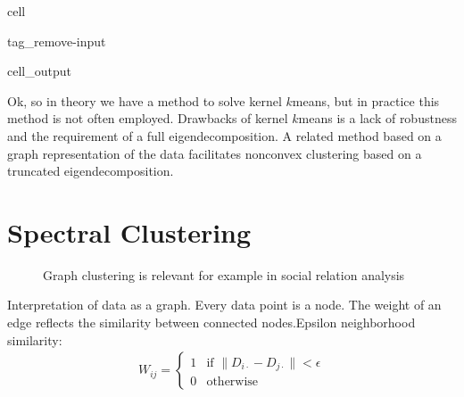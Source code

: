 \documentclass[letterpaper,10pt,english]{jupyterBook}
\let\sphinxpxdimen\pdfpxdimen\else\newdimen\sphinxpxdimen
\begin{document}
\begin{sphinxuseclass}{cell}
\begin{sphinxuseclass}{tag_remove-input}\begin{sphinxVerbatimOutput}

\begin{sphinxuseclass}{cell_output}
\noindent{}

\end{sphinxuseclass}\end{sphinxVerbatimOutput}

\end{sphinxuseclass}
\end{sphinxuseclass}
\sphinxAtStartPar
Ok, so in theory we have a method to solve kernel \(k\)\sphinxhyphen{}means, but in practice this method is not often employed. Drawbacks of kernel \(k\)\sphinxhyphen{}means is a lack of robustness and the requirement of a full eigendecomposition. A related method based on a graph representation of the data facilitates nonconvex clustering based on a truncated eigendecomposition.

\sphinxstepscope


\section{Spectral Clustering}
\label{\detokenize{clustering_spectral:spectral-clustering}}\label{\detokenize{clustering_spectral::doc}}
\begin{figure}[htbp]
\centering
\capstart

\noindent\sphinxincludegraphics[height=300\sphinxpxdimen]{{facebook}.jpg}
\caption{Graph clustering is relevant for example in social relation analysis}\label{\detokenize{clustering_spectral:social-graph}}\end{figure}

\sphinxAtStartPar
Interpretation of data as a graph. Every data point is a node. The weight of an edge reflects the similarity between connected nodes.Epsilon neighborhood similarity:
\begin{equation*}
\begin{split}W_{ij}= \begin{cases}1& \text{if } \lVert D_{i\cdot}-D_{j\cdot}\rVert<\epsilon\\
0& \text{otherwise}\end{cases}\end{split}
\end{equation*}
\end{document}
